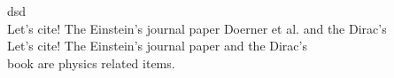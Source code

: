 \documentclass{article}
\begin{document}
dsd\\
Let's cite! The Einstein's journal paper Doerner et al.\@ \cite{smas} and the Dirac's \\
Let's cite! The Einstein's journal paper \citet{smas} and the Dirac's \\
book \cite{Test12} are physics related items. 


\end{document}
